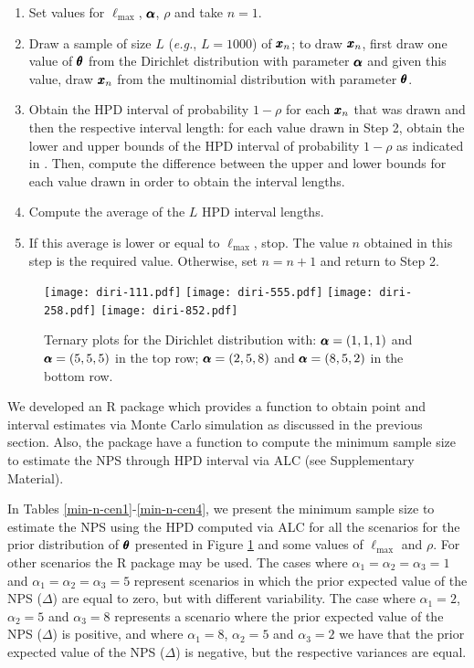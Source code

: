 \documentclass[12pt,a4paper]{article}%
\newcommand*{\bff}[1]{\ifmmode\pmb{#1}\else\textbf{#1}\fi}
\begin{document}
\begin{enumerate}
 \item Set values for $\ell_{\text{max}}$, $\bff{\alpha}$, $\rho$ and take $n=1$.
 \item Draw a sample of size $L$ ({\it e.g.}, $L=1000$) of $\bff{x}_n$; to draw $\bff{x}_n$, first draw one value of $\bff{\theta}$ from the Dirichlet distribution with parameter $\bff{\alpha}$ and given this value, draw $\bff{x}_n$ from the multinomial distribution with parameter $\bff{\theta}$. 
 \item Obtain the HPD interval of probability $1-\rho$ for each $\bff{x}_n$ that was drawn and then the respective interval length: for each value drawn in Step 2, obtain the lower and upper bounds of the HPD interval of probability $1-\rho$ as indicated in \cite{ChenShao99}. Then, compute the difference between the upper and lower bounds for each value drawn in order to obtain the interval lengths.
 \item Compute the average of the $L$ HPD interval lengths.
 \item If this average is lower or equal to $\ell_{\text{max}}$, stop. The value $n$ obtained in this step is the required value. Otherwise, set $n=n+1$ and return to Step 2.
\end{enumerate}


\begin{figure}[h]
 \centering
 \texttt{[image: diri-111.pdf]}
 \texttt{[image: diri-555.pdf]}
 \texttt{[image: diri-258.pdf]}
 \texttt{[image: diri-852.pdf]}
 \caption{Ternary plots for the Dirichlet distribution with: $\bff{\alpha}= (1, 1, 1)$ and $\bff{\alpha}=(5, 5, 5)$ in the top row; $\bff{\alpha}=(2, 5, 8)$ and $\bff{\alpha}=(8, 5, 2)$ in the bottom row.}
 \label{fig-priors}
\end{figure}

We developed an R package \citep{R21} which provides a function to obtain point and interval estimates via Monte Carlo simulation as discussed in the previous section. Also, the package have a function to compute the minimum sample size to estimate the NPS through HPD interval via ALC (see Supplementary Material).

In Tables \ref{min-n-cen1}-\ref{min-n-cen4}, we present the minimum sample size to estimate the NPS using the HPD computed via ALC for all the scenarios for the prior distribution of $\bff{\theta}$ presented in Figure \ref{fig-priors} and some values of $\ell_{\text{max}}$ and $\rho$. For other scenarios the R package may be used. The cases where $\alpha_1=\alpha_2=\alpha_3=1$ and $\alpha_1=\alpha_2=\alpha_3=5$ represent scenarios in which the prior expected value of the NPS ($\Delta$) are equal to zero, but with different variability. The case where $\alpha_1=2$, $\alpha_2=5$ and $\alpha_3=8$ represents a scenario where the prior expected value of the NPS ($\Delta$) is positive, and where $\alpha_1=8$, $\alpha_2=5$ and $\alpha_3=2$ we have that the prior expected value of the NPS ($\Delta$) is negative, but the respective variances are equal.
\end{document}
